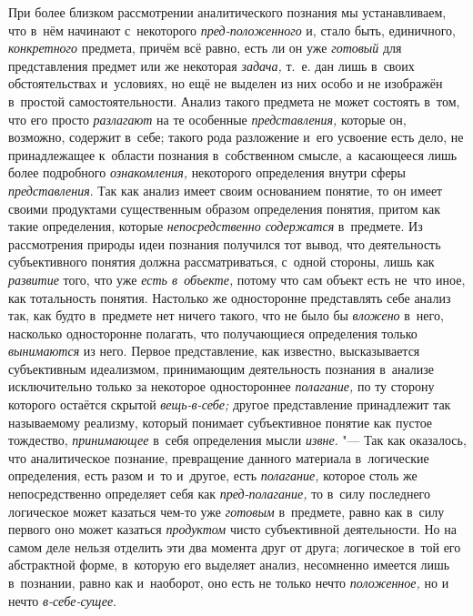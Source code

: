 При более близком рассмотрении аналитического познания мы
устанавливаем, что в~нём начинают с~некоторого
{\em пред-положенного}
и, стало быть, единичного,
{\em конкретного}
предмета, причём всё равно, есть ли он уже
{\em готовый} для
представления предмет или же некоторая
{\em задача,} т.~е. дан
лишь в~своих обстоятельствах и~условиях, но ещё не выделен из них особо и
не изображён в~простой самостоятельности. Анализ такого предмета не может
состоять в~том, что его просто
{\em разлагают} на те
особенные {\em представления,}
которые он, возможно, содержит в~себе; такого рода разложение
и~его усвоение есть дело, не принадлежащее к~области познания в~собственном
смысле, а~касающееся лишь более подробного
{\em ознакомления,}
некоторого определения внутри сферы
{\em представления}. Так
как анализ имеет своим основанием понятие, то он имеет своими продуктами
существенным образом определения понятия, притом как такие определения,
которые {\em непосредственно
содержатся} в~предмете. Из рассмотрения природы идеи
познания получился тот вывод, что деятельность субъективного понятия должна
рассматриваться, с~одной стороны, лишь как
{\em развитие} того, что
уже {\em есть в~объекте,}
потому что сам объект есть не~что иное, как тотальность
понятия. Настолько же односторонне представлять себе анализ так, как будто
в~предмете нет ничего такого, что не было бы
{\em вложено} в~него,
насколько односторонне полагать, что получающиеся определения
только {\em вынимаются}
из него. Первое представление, как известно, высказывается
субъективным идеализмом, принимающим деятельность познания в~анализе
исключительно только за некоторое одностороннее
{\em полагание,} по ту
сторону которого остаётся скрытой
{\em вещь-в-себе;} другое
представление принадлежит так называемому реализму, который понимает
субъективное понятие как пустое тождество,
{\em принимающее} в~себя
определения мысли {\em извне}. "---
Так как оказалось, что аналитическое познание, превращение
данного материала в~логические определения, есть разом и~то и~другое, есть
{\em полагание,} которое
столь же непосредственно определяет себя как
{\em пред-полагание,} то
в~силу последнего логическое может казаться чем-то уже
{\em готовым} в~предмете,
равно как в~силу первого оно может казаться
{\em продуктом} чисто
субъективной деятельности. Но на самом деле нельзя отделить эти два момента
друг от друга; логическое в~той его абстрактной форме, в~которую его
выделяет анализ, несомненно имеется лишь в~познании, равно как и~наоборот,
оно есть не только нечто
{\em положенное,} но и
нечто {\em в-себе-сущее}.

